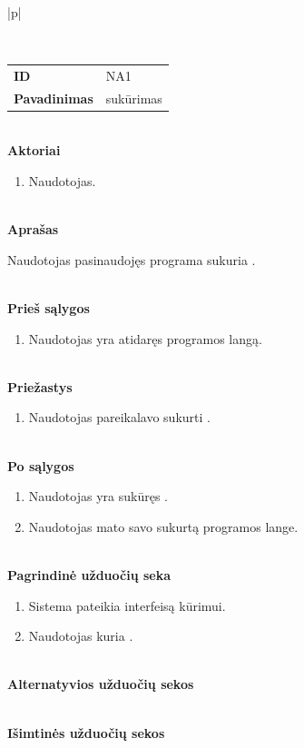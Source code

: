 \begin{center}
    \begin{longtable}{|p{\textwidth}|}
    \caption{\DVCM{} kūrimo naudojimo atvejis}
	\label{tab:program_re_dvcm_creation}
	\\ \hline
    \begin{tabular}{@{}p{3.5cm}p{12cm}}
    	\\
    	\textbf{ID} & NA1
    	\\
    	\textbf{Pavadinimas} & \DVCM{} sukūrimas
    	\\
    \end{tabular}
    \\
    \textbf{Aktoriai}
    \begin{enumerate}
    	\item Naudotojas.
	\end{enumerate}
    \\
    \textbf{Aprašas}

      Naudotojas pasinaudojęs programa sukuria \DVCM{}.

    \\
    \textbf{Prieš sąlygos}
    \begin{enumerate}
    	\item Naudotojas yra atidaręs programos langą.
	\end{enumerate}
    \\
    \textbf{Priežastys}
    \begin{enumerate}
    	\item Naudotojas pareikalavo sukurti \DVCM{}.
	\end{enumerate}
    \\
    \textbf{Po sąlygos}
    \begin{enumerate}
    	\item Naudotojas yra sukūręs \DVCM{}.
      \item Naudotojas mato savo sukurtą \DVCM{} programos lange.
	\end{enumerate}
    \\
    \textbf{Pagrindinė užduočių seka}
    \begin{enumerate}
    	\item Sistema pateikia interfeisą \DVCM{} kūrimui.
    	\item Naudotojas kuria \DVCM{}.
	\end{enumerate}
    \\
    \textbf{Alternatyvios užduočių sekos}

    \\
    \textbf{Išimtinės užduočių sekos}

    \\
    \\ \hline
    \end{longtable}
\end{center}

